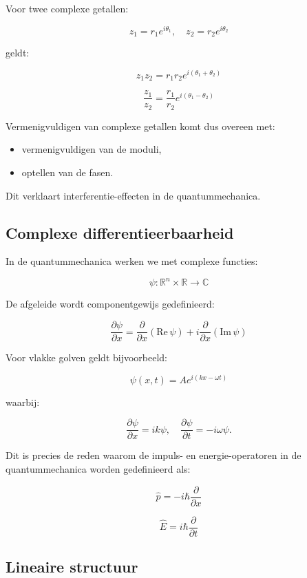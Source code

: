 \documentclass{report} %
\begin{document}
    Voor twee complexe getallen:

    \[
        z_1 = r_1 e^{i\theta_1}, \quad z_2 = r_2 e^{i\theta_2}
    \]

    geldt:

    \[
        z_1 z_2 = r_1 r_2 e^{i(\theta_1+\theta_2)}
    \]

    \[
        \frac{z_1}{z_2} = \frac{r_1}{r_2} e^{i(\theta_1-\theta_2)}
    \]

    Vermenigvuldigen van complexe getallen komt dus overeen met:
    \begin{itemize}
        \item vermenigvuldigen van de moduli,
        \item optellen van de fasen.
    \end{itemize}

    Dit verklaart interferentie-effecten in de quantummechanica.

    \subsection{Complexe differentieerbaarheid}

    In de quantummechanica werken we met complexe functies:

    \[
        \psi : \mathbb{R}^n \times \mathbb{R} \to \mathbb{C}
    \]

    De afgeleide wordt componentgewijs gedefinieerd:

    \[
        \frac{\partial \psi}{\partial x}
        =
        \frac{\partial}{\partial x}(\mathrm{Re}\,\psi)
        +
        i
        \frac{\partial}{\partial x}(\mathrm{Im}\,\psi)
    \]

    Voor vlakke golven geldt bijvoorbeeld:

    \[
        \psi(x,t) = Ae^{i(kx-\omega t)}
    \]

    waarbij:

    \[
        \frac{\partial \psi}{\partial x} = ik\psi,
        \quad
        \frac{\partial \psi}{\partial t} = -i\omega\psi.
    \]

    Dit is precies de reden waarom de impuls- en energie-operatoren in de quantummechanica worden gedefinieerd als:

    \[
        \hat{p} = -i\hbar \frac{\partial}{\partial x}
    \]

    \[
        \hat{E} = i\hbar \frac{\partial}{\partial t}
    \]

    \subsection{Lineaire structuur}
\end{document}
